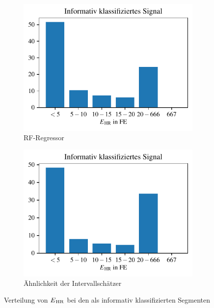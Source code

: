  \begin{figure}[h]
 	\centering
		\begin{subfigure}{.45\textwidth}
			\centering
 			\includegraphics[scale=0.7]{pic/rf-own-final-10-positives.pdf}
 			\caption{\ac{RF}-Regressor}
 		\end{subfigure}
    	\begin{subfigure}{.45\textwidth}
    		\centering
 			\includegraphics[scale=0.7]{pic/brueser03-positives.pdf}
 			\caption{Ähnlichkeit der Intervallschätzer}
 		\end{subfigure}
 	\caption{Verteilung von $E\textsubscript{HR}$ bei den als informativ klassifizierten Segmenten}
 	\label{fig:own-10-positives}
 \end{figure}
 
